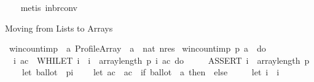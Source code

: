 \begin{isabellebody}
\ \ \isamarkupfalse%
\ {\isacharparenleft}{\kern0pt}metis\ in{\isacharunderscore}{\kern0pt}br{\isacharunderscore}{\kern0pt}conv{\isacharparenright}{\kern0pt}%
\endisatagproof
{\isafoldproof}%
%
\isadelimproof
%
\endisadelimproof
%
\begin{isamarkuptext}%
Moving from Lists to Arrays%
\end{isamarkuptext}\isamarkuptrue%
\isamarkupfalse%
\ win{\isacharunderscore}{\kern0pt}count{\isacharunderscore}{\kern0pt}imp{}\ {\isacharcolon}{\kern0pt}{\isacharcolon}{\kern0pt}\ {\isachardoublequoteopen}{\isacharprime}{\kern0pt}a\ Profile{\isacharunderscore}{\kern0pt}Array\ {\isasymRightarrow}\ {\isacharprime}{\kern0pt}a\ {\isasymRightarrow}\ nat\ nres{\isachardoublequoteclose}\ \isanewline
{\isachardoublequoteopen}win{\isacharunderscore}{\kern0pt}count{\isacharunderscore}{\kern0pt}imp{}\ p\ a\ {\isasymequiv}\ do\ {\isacharbraceleft}{\kern0pt}\isanewline
\ \ {\isacharparenleft}{\kern0pt}i{\isacharcomma}{\kern0pt}\ ac{\isacharparenright}{\kern0pt}\ {\isasymleftarrow}\ WHILET\ {\isacharparenleft}{\kern0pt}{\isasymlambda}{\isacharparenleft}{\kern0pt}i{\isacharcomma}{\kern0pt}\ {\isacharunderscore}{\kern0pt}{\isacharparenright}{\kern0pt}{\isachardot}{\kern0pt}\ i\ {\isacharless}{\kern0pt}\ array{\isacharunderscore}{\kern0pt}length\ p{\isacharparenright}{\kern0pt}\ {\isacharparenleft}{\kern0pt}{\isasymlambda}{\isacharparenleft}{\kern0pt}i{\isacharcomma}{\kern0pt}\ ac{\isacharparenright}{\kern0pt}{\isachardot}{\kern0pt}\ do\ {\isacharbraceleft}{\kern0pt}\isanewline
\ \ \ \ ASSERT\ {\isacharparenleft}{\kern0pt}i\ {\isacharless}{\kern0pt}\ array{\isacharunderscore}{\kern0pt}length\ p{\isacharparenright}{\kern0pt}{\isacharsemicolon}{\kern0pt}\isanewline
\ \ \ \ let\ ballot\ {\isacharequal}{\kern0pt}\ {\isacharparenleft}{\kern0pt}p{\isacharbrackleft}{\kern0pt}{\isacharbrackleft}{\kern0pt}i{\isacharbrackright}{\kern0pt}{\isacharbrackright}{\kern0pt}{\isacharparenright}{\kern0pt}{\isacharsemicolon}{\kern0pt}\isanewline
\ \ \ \ let\ ac\ {\isacharequal}{\kern0pt}\ ac\ {\isacharplus}{\kern0pt}\ {\isacharparenleft}{\kern0pt}if\ {\isacharparenleft}{\kern0pt}ballot{\isacharbrackleft}{\kern0pt}{\isacharbrackleft}{\kern0pt}{}{\isacharbrackright}{\kern0pt}{\isacharbrackright}{\kern0pt}\ {\isacharequal}{\kern0pt}\ a{\isacharparenright}{\kern0pt}\ then\ {}\ else\ {}{\isacharparenright}{\kern0pt}{\isacharsemicolon}{\kern0pt}\isanewline
\ \ \ \ let\ i\ {\isacharequal}{\kern0pt}\ i\ {\isacharplus}{\kern0pt}\ {}{\isacharsemicolon}{\kern0pt}\isanewline

\end{isabellebody}
